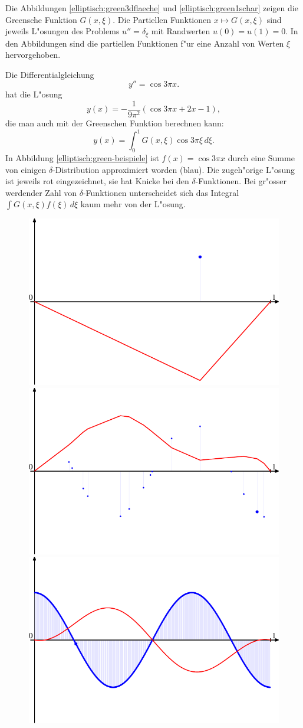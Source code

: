 Die Abbildungen \ref{elliptisch:green3dflaeche} und
\ref{elliptisch:green1schar} zeigen die Greensche Funktion $G(x,\xi)$.
Die Partiellen Funktionen $x\mapsto G(x,\xi)$ sind jeweils L"osungen
des Problems $u''=\delta_\xi$ mit Randwerten $u(0)=u(1)=0$.
In den Abbildungen sind die partiellen Funktionen f"ur eine Anzahl
von Werten $\xi$ hervorgehoben.

\begin{beispiel}
Die Differentialgleichung
\[
y''=\cos 3\pi x.
\]
hat die L"osung
\[
y(x)=-\frac1{9\pi^2}(\cos 3\pi x + 2x - 1),
\]
die man auch mit der Greenschen Funktion berechnen kann:
\[
y(x)=\int_0^1 G(x,\xi)\cos 3\pi\xi\,d\xi.
\]
In Abbildung
\ref{elliptisch:green-beispiele}
ist $f(x)=\cos 3\pi x$ durch eine Summe von einigen $\delta$-Distribution
approximiert worden (blau).
Die zugeh"orige L"osung ist jeweils rot eingezeichnet, sie hat
Knicke bei den $\delta$-Funktionen. 
Bei gr"osser werdender Zahl von $\delta$-Funktionen unterscheidet sich
das Integral $\int G(x,\xi)f(\xi)\,d\xi$ kaum mehr von der L"osung.
\begin{figure}
\begin{center}
\includegraphics[width=0.7\hsize]{graphics/green-1.pdf}\\
\includegraphics[width=0.7\hsize]{graphics/green-324.pdf}\\
\includegraphics[width=0.7\hsize]{graphics/green-1082.pdf}

\end{center}
\end{figure}
\end{beispiel}
